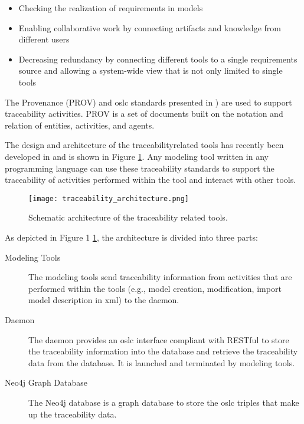 \begin{itemize}
\item Checking the realization of requirements in models
\item Enabling collaborative work by connecting artifacts and knowledge from different users
\item Decreasing redundancy by connecting different tools to a single requirements source and allowing
a system-wide view that is not only limited to single tools
\end{itemize}

The Provenance (PROV) \cite{provluc} and \acrshort{oslc} standards presented in \cite{intocpsjohn})
are used to support traceability activities. PROV is a set of documents built on the notation and relation of
entities, activities, and agents.

The design and architecture of the traceabilityrelated tools has recently been developed in \cite{intocpskenneth} and is shown in Figure  \ref{fig:traceabilityarchitecture}. Any modeling tool written in any programming language can use these traceability standards to support the traceability of activities performed within the tool and interact with other tools.

\begin{figure}
	\texttt{[image: traceability\_architecture.png]}
	\caption{Schematic architecture of the traceability related tools.}
	\label{fig:traceabilityarchitecture}
\end{figure}


As depicted in Figure 1 \ref{fig:traceabilityarchitecture}, the architecture is divided into three parts:

\begin{description}
\item[Modeling Tools] The modeling tools send traceability information from activities that are performed within the tools (e.g., model creation,
modification, import model description in \acrshort{xml}) to the daemon.
\item[Daemon] The daemon provides an \acrshort{oslc} interface compliant with RESTful \cite{restfulleonardo} to store the traceability 
information into the database and retrieve the traceability data from the database. It is launched and terminated by modeling tools.
\item[Neo4j Graph Database] The Neo4j database \cite{neo4j} is a graph database to store the \acrshort{oslc} triples that make up the traceability data. 

\end{description}


